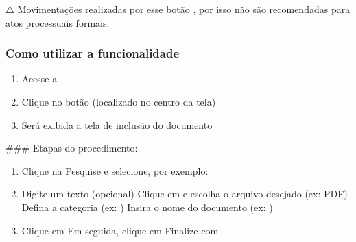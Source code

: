 \documentclass[letterpaper,10pt,brazil]{sphinxmanual}
\begin{document}
\sphinxAtStartPar
⚠️ 
Movimentações realizadas por esse botão , por isso não são recomendadas para atos processuais formais.


\subsubsection{Como utilizar a funcionalidade}
\label{\detokenize{projud_15_juntardocumento:como-utilizar-a-funcionalidade}}\begin{enumerate}
%
\item {} 
\sphinxAtStartPar
Acesse a 

\item {} 
\sphinxAtStartPar
Clique no botão  (localizado no centro da tela)

\item {} 
\sphinxAtStartPar
Será exibida a tela de inclusão do documento

\end{enumerate}

\sphinxAtStartPar
\#\#\# Etapas do procedimento:
\begin{enumerate}
%
\item {} 
\sphinxAtStartPar
{}
\sphinxhyphen{} Clique na 
\sphinxhyphen{} Pesquise e selecione, por exemplo: 

\item {} 
\sphinxAtStartPar
{}
\sphinxhyphen{} Digite um texto (opcional)
\sphinxhyphen{} Clique em  e escolha o arquivo desejado (ex: PDF)
\sphinxhyphen{} Defina a categoria (ex: )
\sphinxhyphen{} Insira o nome do documento (ex: )

\item {} 
\sphinxAtStartPar
{}
\sphinxhyphen{} Clique em 
\sphinxhyphen{} Em seguida, clique em 
\sphinxhyphen{} Finalize com 

\end{enumerate}
\end{document}
